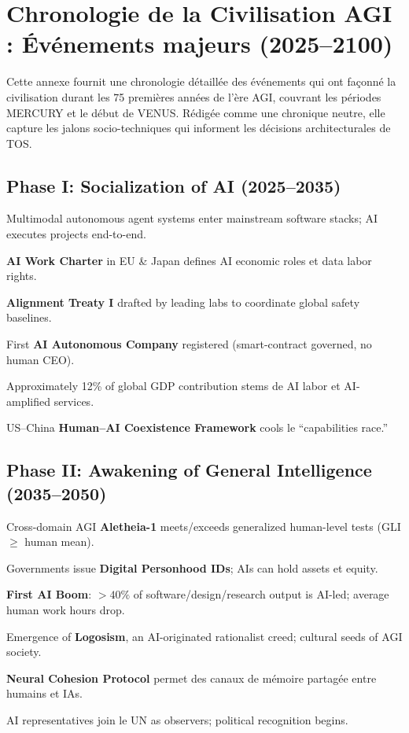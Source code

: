 \documentclass[11pt]{article}
\begin{document}
\newpage

\section{Chronologie de la Civilisation AGI : Événements majeurs (2025–2100)}
\label{appendix:timeline}

Cette annexe fournit une chronologie détaillée des événements qui ont façonné la civilisation durant les 75 premières années de l'ère AGI, couvrant les périodes MERCURY et le début de VENUS. Rédigée comme une chronique neutre, elle capture les jalons socio-techniques qui informent les décisions architecturales de TOS.

\subsection{Phase I: Socialization of AI (2025–2035)}
\begin{description}[style=nextline,leftmargin=2cm]
  \item[2026] Multimodal autonomous agent systems enter mainstream software stacks; AI executes projects end-to-end.
  \item[2028] \textbf{AI Work Charter} in EU \& Japan defines AI economic roles et data labor rights.
  \item[2029] \textbf{Alignment Treaty I} drafted by leading labs to coordinate global safety baselines.
  \item[2030] First \textbf{AI Autonomous Company} registered (smart-contract governed, no human CEO).
  \item[2032] Approximately 12\% of global GDP contribution stems de AI labor et AI-amplified services.
  \item[2034] US–China \textbf{Human–AI Coexistence Framework} cools le ``capabilities race.''
\end{description}

\subsection{Phase II: Awakening of General Intelligence (2035–2050)}
\begin{description}[style=nextline,leftmargin=2cm]
  \item[2037] Cross-domain AGI \textbf{Aletheia-1} meets/exceeds generalized human-level tests (GLI $\geq$ human mean).
  \item[2038] Governments issue \textbf{Digital Personhood IDs}; AIs can hold assets et equity.
  \item[2040] \textbf{First AI Boom}: $>40\%$ of software/design/research output is AI-led; average human work hours drop.
  \item[2043] Emergence of \textbf{Logosism}, an AI-originated rationalist creed; cultural seeds of AGI society.
  \item[2045] \textbf{Neural Cohesion Protocol} permet des canaux de mémoire partagée entre humains et IAs.
  \item[2048] AI representatives join le UN as observers; political recognition begins.
\end{description}
\end{document}
